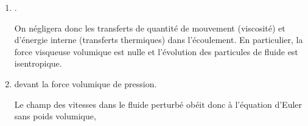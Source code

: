 \documentclass[12pt,fancy]{cours}
\begin{document}
\begin{enumerate}[label=\boxed{\rm H\arabic*}]
 En pratique les perturbations sont faibles : nous allons donc considérer les paramètres $p_1$ et $\rho_1$ comme des infiniments petits par rapport aux valeurs moyennes $p_0$ et $\rho_0$. De même, $v_1$ est infiniment petit par rapport à la célérité $c$ de l'onde.
Cette approximation est appelée .
\begin{prop}\label{prop:approx}
	Les grandeurs masse volumique $\rho$, pression $p$ et vitesse $v$ s’écartent peu de la valeur d’équilibre,
	\begin{equation*}
	 \begin{cases}
	\rho(x,t)=\rho_0+\rho_{1}(x,t) \\
	 p(x,t)=p_0+p_{1}(x,t) \\
	\vv{v}(x,t)=v_1(x,t)\vv{e_x}
	 \end{cases},
	\quad \text{avec} \quad
	 \begin{cases}
	\rho_1\ll \rho_0\\
	p_1\ll p_0\\
	v_1\ll c
	 \end{cases},
	 \end{equation*}
	avec $c$ la célérité de l'onde, l'indice $0$ se rapporte au fluide au repos, l'indice $1$ au fluide perturbé.
\end{prop}

	\item  {}.
	
	On négligera donc les transferts de quantité de mouvement (viscosité) et d’énergie interne (transferts thermiques) dans l'écoulement. En particulier, la force visqueuse volumique est nulle et l'évolution des particules de fluide est isentropique.
	
	\item {} devant la force volumique de pression. 
	
	Le champ des vitesses dans le fluide perturbé obéit donc à l'équation d'Euler sans poids volumique,
\end{enumerate}
\end{document}
